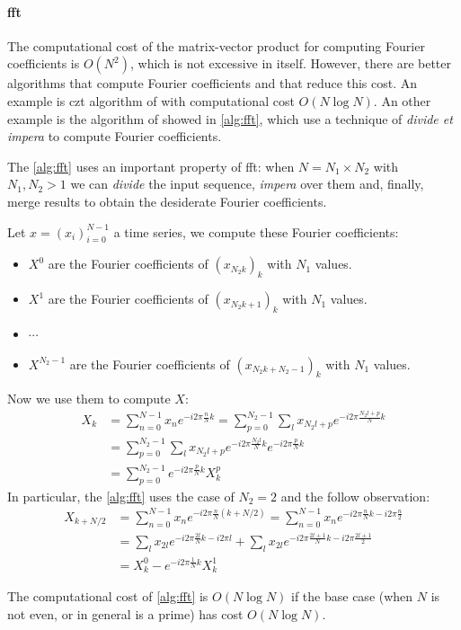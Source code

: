 \begin{modified}
\paragraph{\gls{fft}} The computational cost of the matrix-vector product for computing Fourier coefficients is $O(N^2)$, which is not excessive in itself. However, there are better algorithms that compute Fourier coefficients and that reduce this cost. An example is \gls{czt} algorithm of \citet{czt_source} with computational cost $O(N\log N)$. An other example is the algorithm of \citet{FFT} showed in \cref{alg:fft}, which use a technique of \textit{divide et impera} to compute Fourier coefficients.
\begin{remark}
	The \cref{alg:fft} uses an important property of \gls{fft}: when $N=N_1\times N_2$ with $N_1, N_2> 1$ we can \textit{divide} the input sequence, \textit{impera} over them and, finally, merge results to obtain the desiderate Fourier coefficients.

	\noindent Let $x=(x_i)_{i=0}^{N-1}$ a time series, we compute these Fourier coefficients:
	\begin{itemize}
		\item $X^{0}$ are the Fourier coefficients of  $\left(x_{N_2k}\right)_k$ with $N_1$ values.
		\item $X^{1}$ are the Fourier coefficients of $\left(x_{N_2k+1}\right)_k$ with $N_1$ values.
		\item $\cdots$
		\item $X^{N_2-1}$ are the Fourier coefficients of $\left(x_{N_2k+N_2-1}\right)_k$ with $N_1$ values.
	\end{itemize}
	Now we use them to compute $X$:
	\begin{align*}
		X_k &= \sum_{n=0}^{N-1} x_n e^{-i2\pi\frac{n}{N}k} = \sum_{p=0}^{N_2-1}\sum_{l} x_{N_2l+p} e^{-i2\pi\frac{N_2l+p}{N}k} \\
		&= \sum_{p=0}^{N_2-1}\sum_{l} x_{N_2l+p} e^{-i2\pi\frac{N_2l}{N}k}e^{-i2\pi\frac{p}{N}k} \\
		&= \sum_{p=0}^{N_2-1}e^{-i2\pi\frac{p}{N}k}X^p_k
	\end{align*}
	In particular, the \cref{alg:fft} uses the case of $N_2=2$ and the follow observation:
	\begin{align*}
		X_{k+N/2} &= \sum_{n=0}^{N-1} x_n e^{-i2\pi\frac{n}{N}\left({k+N/2}\right)} = \sum_{n=0}^{N-1} x_n e^{-i2\pi\frac{n}{N}k -i2\pi\frac{n}{2}} \\
		&= \sum_{l} x_{2l} e^{-i2\pi\frac{2l}{N}k -i2\pi l} + \sum_{l} x_{2l} e^{-i2\pi\frac{2l+1}{N}k -i2\pi\frac{2l+1}{2}} \\
		&= X^0_k - e^{-i2\pi\frac{1}{N}k}X^1_k
	\end{align*}
\end{remark}
\noindent The computational cost of \cref{alg:fft} is $O(N\log N)$ if the base case (when $N$ is not even, or in general is a prime) has cost $O(N\log N)$.
\end{modified}

